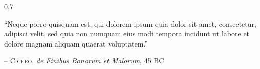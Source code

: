 \hypersetup{pdftitle=\@title}

\ifdraft

\let\cleardoublepage\relax
\let\clearpage\relax

\let\stdchapter\chapter
\renewcommand*\chapter{%
  \@ifstar{\starchapter}{\@dblarg\nostarchapter}}
\newcommand*\starchapter[1]{\newpage\stdchapter*{#1}}
\def\nostarchapter[#1]#2{
  \ifnumequal{\value{chapter}}{0}{}{\newpage}
  \stdchapter[{#1}]{#2}}


\date{\today}

\maketitle
\begin{abstract}
  \abstractc
\end{abstract}
\makeatother

\else
{}

\maketitle

\pagestyle{empty}

\thispagestyle{empty}

\cleardoublepage

\ifofficial
\else
\vspace*{12cm}

\epigraph{0.7\textwidth}{``Neque porro quisquam est, qui dolorem ipsum quia dolor sit amet, consectetur, adipisci velit, sed quia non numquam eius modi tempora incidunt ut labore et dolore magnam aliquam quaerat voluptatem.''}{-- \textsc{Cicero}, \textit{de Finibus Bonorum et Malorum}, 45 BC}

\cleardoublepage
\fi

\thispagestyle{empty}
\begin{minipage}{0.4\textwidth}
\end{minipage}





